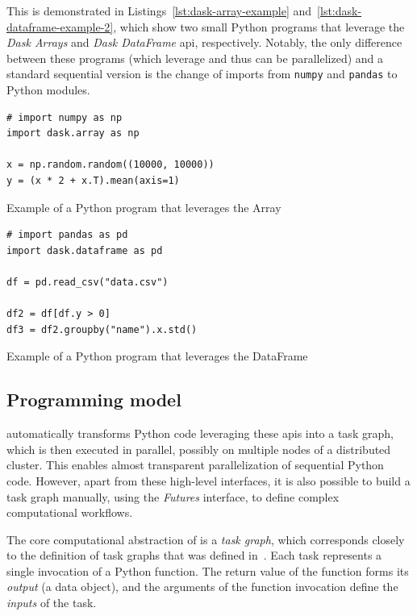 This is demonstrated in Listings~\ref{lst:dask-array-example} and~\ref{lst:dask-dataframe-example-2}, which show two
small Python programs that leverage the \emph{Dask Arrays} and \emph{Dask DataFrame}
\gls{api}, respectively. Notably, the only difference between these programs
(which leverage \dask{} and thus can be parallelized) and a standard sequential
version is the change of imports from \texttt{numpy} and \texttt{pandas}
to \dask{} Python modules.

\begin{listing}[h]
	\begin{verbatim}
# import numpy as np
import dask.array as np

x = np.random.random((10000, 10000))
y = (x * 2 + x.T).mean(axis=1)
	\end{verbatim}
	\caption{Example of a Python program that leverages the \dask{} Array
	}
	\label{lst:dask-array-example}
\end{listing}

\begin{listing}[h]
	\begin{verbatim}
# import pandas as pd
import dask.dataframe as pd

df = pd.read_csv("data.csv")

df2 = df[df.y > 0]
df3 = df2.groupby("name").x.std()
	\end{verbatim}
	\caption{Example of a Python program that leverages the \dask{} DataFrame
	}
	\label{lst:dask-dataframe-example-2}
\end{listing}

\subsection*{Programming model}
\dask{} automatically transforms Python code leveraging these
\glspl{api} into a task graph, which is then executed in parallel, possibly on
multiple nodes of a distributed cluster. This enables almost transparent parallelization of
sequential Python code. However, apart from these high-level interfaces, it is also possible to
build a task graph manually, using the \emph{Futures} interface, to define complex
computational workflows.

The core computational abstraction of \dask{} is a \emph{task graph},
which corresponds closely to the definition of task graphs that was defined
in~. Each task represents a single invocation of a Python function. The
return value of the function forms its \emph{output} (a data object), and the arguments of the
function invocation define the \emph{inputs} of the task.

